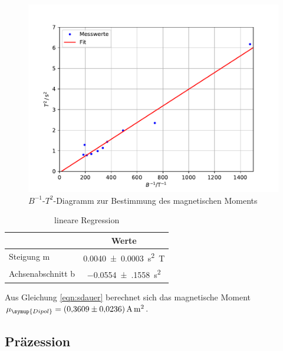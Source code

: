 \begin{figure}[H]
  \centering
  \includegraphics[width=\textwidth]{Plots/schw.pdf}
  \caption{$B^{-1}$-$T^2$-Diagramm zur Bestimmung des magnetischen Moments}
  \label{fig:schw}
\end{figure}

\begin{table}[H]
  \centering
  \caption{lineare Regression}
  \label{tab:lin2}
  \begin{tabular}{l c}
    \toprule
       & {Werte}\\
    \midrule
    Steigung m & \SI{0.0040(3)}{\square \second \tesla} \\
    Achsenabschnitt b & \SI{-0.0554(1558)}{\square \second} \\
    \bottomrule
  \end{tabular}
\end{table}
Aus Gleichung \eqref{eqn:sdauer} berechnet sich das magnetische Moment
$\mu_{\symup{Dipol}} = \SI{0,3609(236)}{\ampere \square \meter}$.
\subsection{Präzession}

